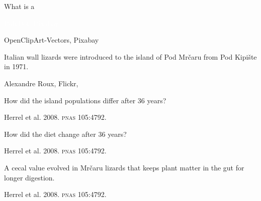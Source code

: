 \documentclass[t]{beamer}
\begin{document}
%
{
\begin{frame}[b]{What is a }

\hfill \tiny \textcolor{white}{PolyDot, Pixabay .}
\end{frame}
}
%
{
\begin{frame}[b]

\hfill \tiny OpenClipArt-Vectors, Pixabay 
\end{frame}
}
%
{
\begin{frame}[b]{\strut Italian wall lizards were introduced to the island of Pod Mr\v{c}aru from Pod Kipi\v{s}te in 1971.}


\hfill\tiny Alexandre Roux, Flickr, 
\end{frame}
}
%
{
\begin{frame}
\end{frame}
}
%
{
\begin{frame}[b]{How did the island populations differ after 36 years?}

\hfill \tiny Herrel et al. 2008. \textsc{pnas} 105:4792.
\end{frame}
}
%
{
\begin{frame}[b]{How did the diet change after 36 years?}
	
\hfill \tiny Herrel et al. 2008. \textsc{pnas} 105:4792.
\end{frame}
}
%
{
	\begin{frame}[b]{A cecal value evolved in Mr\v{c}aru lizards that keeps plant matter in the gut for longer digestion.}
	
	\hfill \tiny Herrel et al. 2008. \textsc{pnas} 105:4792.
\end{frame}
}
%
%	
%
%
%
\end{document}
